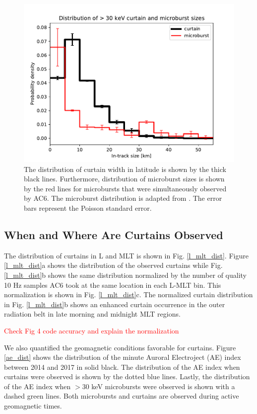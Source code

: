 \documentclass[draft]{agujournal2019}
\begin{document}
\begin{figure}
\includegraphics[width=\textwidth]{ac6_curtain_microburst_width_dist.pdf}
\caption{The distribution of curtain width in latitude is shown by the thick black lines. Furthermore, distribution of microburst sizes is shown by the red lines for microbursts that were simultaneously observed by AC6. The microburst distribution is adapted from . The error bars represent the Poisson standard error.}
\label{width_dist}
\end{figure}

\subsection{When and Where Are Curtains Observed}
The distribution of curtains in L and MLT is shown in Fig. \ref{l_mlt_dist}. Figure \ref{l_mlt_dist}a shows the distribution of the observed curtains while Fig. \ref{l_mlt_dist}b shows the same distribution normalized by the number of quality 10 Hz samples AC6 took at the same location in each L-MLT bin. This normalization is shown in Fig. \ref{l_mlt_dist}c. The normalized curtain distribution in Fig. \ref{l_mlt_dist}b shows an enhanced curtain occurrence in the outer radiation belt in late morning and midnight MLT regions.

\textcolor{red}{Check Fig 4 code accuracy and explain the normalization}

We also quantified the geomagnetic conditions favorable for curtains. Figure \ref{ae_dist} shows the distribution of the minute Auroral Electroject (AE) index between 2014 and 2017 in solid black. The distribution of the AE index when curtains were observed is shown by the dotted blue lines. Lastly, the distribution of the AE index when $> 30$ keV microbursts were observed is shown with a dashed green lines. Both microbursts and curtains are observed during active geomagnetic times.
\end{document}
